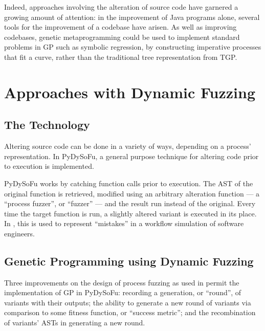 \documentclass[draft,12pt]{llncs}   %
\begin{document}
Indeed, approaches involving the alteration of source code have garnered a
growing amount of attention: in the improvement of Java programs alone, several
tools for the improvement of a codebase have
arisen\cite{cody2015locogp,arcuri2008multi,orlov2011flight,castle2012evolving}.
As well as improving codebases, genetic metaprogramming could be used to
implement standard problems in GP such as symbolic regression, by constructing
imperative processes that fit a curve, rather than the traditional tree
representation from TGP\cite{koza1994genetic}.
\par


\section{Approaches with Dynamic Fuzzing}
\label{sec:dynamic_fuzzing}
\subsection{The Technology}
Altering source code can be done in a variety of ways, depending on a process'
representation. In PyDySoFu\cite{pydysofu}, a general purpose technique for altering
code prior to execution is implemented.\par

PyDySoFu works by catching function calls prior to execution. The AST of the
original function is retrieved, modified using an arbitrary alteration function
--- a ``process fuzzer'', or ``fuzzer'' --- and the result run instead of the
original. Every time the target function is run, a slightly altered
variant is executed in its place. In \cite{wallis2018a}, this is used to represent
``mistakes'' in a workflow simulation of software engineers.\par

\subsection{Genetic Programming using Dynamic Fuzzing}
Three improvements on the design of process fuzzing as used in
\cite{wallis2018a} permit the implementation of GP in PyDySoFu: recording a
generation, or ``round'', of variants with their outputs; the ability to
generate a new round of variants via comparison to some fitness function, or
``success metric''; and the recombination of variants' ASTs in generating a new
round.\par
\end{document}
